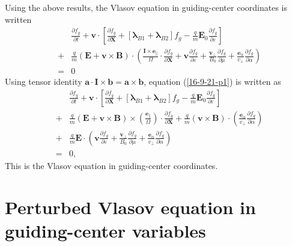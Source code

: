\documentclass{llncs}
\newcommand{\tmmathbf}[1]{\ensuremath{\boldsymbol{#1}}}
\begin{document}
Using the above results, the Vlasov equation in guiding-center coordinates is
written
\begin{eqnarray}
  &  & \frac{\partial f_g}{\partial t} +\mathbf{v} \cdot \left[
  \frac{\partial f_g}{\partial \mathbf{X}} + [\tmmathbf{\lambda}_{B 1}
  +\tmmathbf{\lambda}_{B 2}] f_g - \frac{q}{m} \mathbf{E}_0 \frac{\partial
  f_g}{\partial \varepsilon} \right] \nonumber\\
  & + & \frac{q}{m} (\mathbf{E}+\mathbf{v} \times \mathbf{B}) \cdot \left(
  \frac{\mathbf{I} \times \tmmathbf{e}_{\parallel}}{\Omega} \cdot
  \frac{\partial f_g}{\partial \mathbf{X}} +\mathbf{v} \frac{\partial
  f_g}{\partial \varepsilon} + \frac{\mathbf{v}_{\perp}}{B_0}  \frac{\partial
  f_g}{\partial \mu} + \frac{\tmmathbf{e}_{\alpha}}{v_{\perp}}  \frac{\partial
  f_g}{\partial \alpha} \right) \nonumber\\
  & = & 0  \label{16-9-21-p1}
\end{eqnarray}
Using tensor identity $\mathbf{a} \cdot \mathbf{I} \times
\mathbf{b}=\mathbf{a} \times \mathbf{b}$, equation (\ref{16-9-21-p1}) is
written as
\begin{eqnarray}
  &  & \frac{\partial f_g}{\partial t} +\mathbf{v} \cdot \left[
  \frac{\partial f_g}{\partial \mathbf{X}} + [\tmmathbf{\lambda}_{B 1}
  +\tmmathbf{\lambda}_{B 2}] f_g - \frac{q}{m} \mathbf{E}_0 \frac{\partial
  f_g}{\partial \varepsilon} \right] \nonumber\\
  & + & \frac{q}{m} (\mathbf{E}+\mathbf{v} \times \mathbf{B}) \times \left(
  \frac{\tmmathbf{e}_{\parallel}}{\Omega}  \right) \cdot \frac{\partial
  f_g}{\partial \mathbf{X}} + \frac{q}{m} (\mathbf{v} \times \mathbf{B}) \cdot
  \left( \frac{\tmmathbf{e}_{\alpha}}{v_{\perp}}  \frac{\partial f_g}{\partial
  \alpha} \right) \nonumber\\
  & + & \frac{q}{m} \mathbf{E} \cdot \left( \mathbf{v} \frac{\partial
  f_g}{\partial \varepsilon} + \frac{\mathbf{v}_{\perp}}{B_0}  \frac{\partial
  f_g}{\partial \mu} + \frac{\tmmathbf{e}_{\alpha}}{v_{\perp}}  \frac{\partial
  f_g}{\partial \alpha} \right) \nonumber\\
  & = & 0,  \label{16-10-2-p1}
\end{eqnarray}
This is the Vlasov equation in guiding-center coordinates.

\section{Perturbed Vlasov equation in guiding-center variables}
\end{document}

